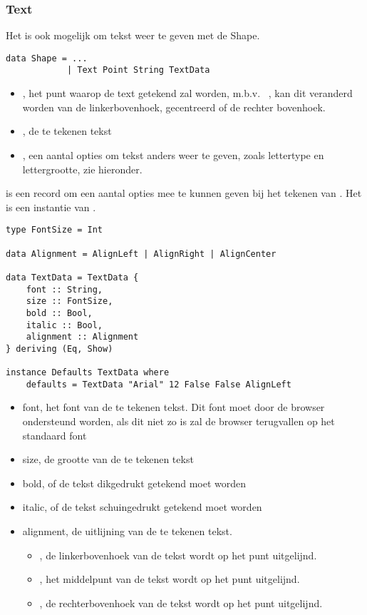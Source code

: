 \subsubsection{Text}
Het is ook mogelijk om tekst weer te geven met de  Shape.
\begin{lstlisting}
data Shape = ...
			| Text Point String TextData
\end{lstlisting} 
\begin{itemize}
	\item {}, het punt waarop de text getekend zal worden, m.b.v. ~, kan dit veranderd worden van de linkerbovenhoek, gecentreerd of de rechter bovenhoek.
	\item {}, de te tekenen tekst
	\item {}, een aantal opties om tekst anders weer te geven, zoals lettertype en lettergrootte, zie hieronder.
\end{itemize}

 is een record om een aantal opties mee te kunnen geven bij het tekenen van . Het is een instantie van .
\begin{lstlisting}
type FontSize = Int

data Alignment = AlignLeft | AlignRight | AlignCenter

data TextData = TextData {
    font :: String,
    size :: FontSize,
    bold :: Bool,
    italic :: Bool,
    alignment :: Alignment
} deriving (Eq, Show)

instance Defaults TextData where
    defaults = TextData "Arial" 12 False False AlignLeft
\end{lstlisting}
\begin{itemize}
	\item font, het font van de te tekenen tekst. Dit font moet door de browser ondersteund worden, als dit niet zo is zal de browser terugvallen op het standaard font
	\item size, de grootte van de te tekenen tekst
	\item bold, of de tekst dikgedrukt getekend moet worden
	\item italic, of de tekst schuingedrukt getekend moet worden
	\item alignment, de uitlijning van de te tekenen tekst. 
		\begin{itemize}
			\item {}, de linkerbovenhoek van de tekst wordt op het punt uitgelijnd.
			\item {}, het middelpunt van de tekst wordt op het punt uitgelijnd.
			\item {}, de rechterbovenhoek van de tekst wordt op het punt uitgelijnd.
		\end{itemize}
\end{itemize}

